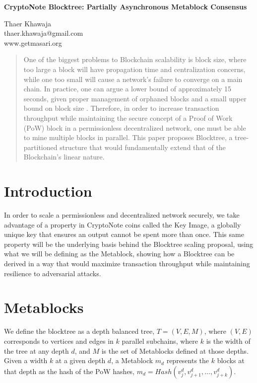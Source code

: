 \documentclass{article}
\begin{document}
\begin{center}
  \textbf{CryptoNote Blocktree: Partially Asynchronous Metablock Consensus}\\
  \vspace{5mm}

  {\small
    Thaer Khawaja\\
    thaer.khawaja@gmail.com\\
    www.getmasari.org\\
  }
  \vspace{5mm}
\end{center}

\begin{abstract}
One of the biggest problems to Blockchain scalability is block size, where too large a block will have propagation time and centralization concerns, while one too small will cause a network's failure to converge on a main chain. In practice, one can argue a lower bound of approximately 15 seconds, given proper management of orphaned blocks and a small upper bound on block size \cite{khawaja}. Therefore, in order to increase transaction throughput while maintaining the secure concept of a Proof of Work (PoW) block in a permissionless decentralized network, one must be able to mine multiple blocks in parallel. This paper proposes Blocktree, a tree-partitioned structure that would fundamentally extend that of the Blockchain's linear nature.
\end{abstract}

\section{Introduction}
In order to scale a permissionless and decentralized network securely, we take advantage of a property in CryptoNote coins called the Key Image, a globally unique key that ensures an output cannot be spent more than once\cite{saberhagen}. This same property will be the underlying basis behind the Blocktree scaling proposal, using what we will be defining as the Metablock, showing how a Blocktree can be derived in a way that would maximize transaction throughput while maintaining resilience to adversarial attacks.
\section{Metablocks}
We define the blocktree as a depth balanced tree, $T = (V, E, M)$, where $(V,E)$ corresponds to vertices and edges in $k$ parallel subchains, where $k$ is the width of the tree at any depth $d$, and $M$ is the set of Metablocks defined at those depths. Given a width $k$ at a given depth $d$, a Metablock $m_d$ represents the $k$ blocks at that depth as the hash of the PoW hashes, $m_d = Hash(v_j^d,v_{j + 1}^d,\ldots,v_{j+k}^d)$.
\end{document}
